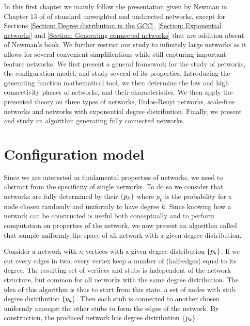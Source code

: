 \documentclass[
11pt, %
english, %
singlespacing, %
nolistspacing, %
liststotoc, %
headsepline, %
]{MastersDoctoralThesis} %
\begin{document}
In this first chapter we mainly follow the presentation given by Newman in Chapter 13 of \cite{newman2010networks} of standard unweighted and undirected networks, except for Sections \ref{Section: Degree distribution in the GCC}, \ref{Section: Exponential networks} and \ref{Section: Generating connected networks} that are addition absent of Newman's book. We further restrict our study to infinitely large networks as it allows for several convenient simplifications while still capturing important feature networks. We first present a general framework for the study of networks, the configuration model, and study several of its properties. Introducing the generating function mathematical tool, we then determine the low and high connectivity phases of networks, and their characteristics. We then apply the presented theory on three types of networks, Erdos-Renyi networks, scale-free networks and networks with exponential degree distribution. Finally, we present and study an algorithm generating fully connected networks.

\section{Configuration model}
\label{Section: Configuration model}

Since we are interested in fundamental properties of networks, we need to abstract from the specificity of single networks. To do so we consider that networks are fully determined by their  $\{p_k\}$ where $p_k$ is the probability for a node chosen randomly and uniformly to have degree $k$. Since knowing how a network can be constructed is useful both conceptually and to perform computation on properties of the network, we now present an algorithm called  \cite{newman2010networks} that sample uniformly the space of all network with a given degree distribution.

Consider a network with $n$ vertices with a given degree distribution $\{p_k\}$. If we cut every edges in two, every vertex keep a number of  (half-edges) equal to its degree. The resulting set of vertices and stubs is independent of the network structure, but common for all networks with the same degree distribution. The idea of this algorithm is thus to start from this state, a set of nodes with stub degree distribution $\{p_k\}$. Then each stub is connected to another chosen uniformly amongst the other stubs to form the edges of the network. By construction, the produced network has degree distribution $\{p_k\}$.
\end{document}
